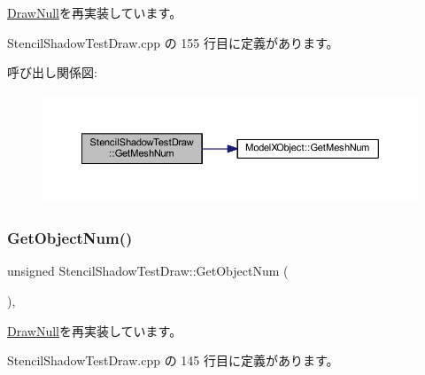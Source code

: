 \mbox{\hyperlink{class_draw_null_ad735978a85a5f3583eecd82d6bfe6413}{Draw\+Null}}を再実装しています。



 Stencil\+Shadow\+Test\+Draw.\+cpp の 155 行目に定義があります。

呼び出し関係図\+:\nopagebreak
\begin{figure}[H]
\begin{center}
\leavevmode
\includegraphics[width=350pt]{class_stencil_shadow_test_draw_acfa569f1dcdc3829796138e313f204ad_cgraph}
\end{center}
\end{figure}
\mbox{\label{class_stencil_shadow_test_draw_a8cc9a54a2bcb1fd006331fca1add02dc}} 
\subsubsection{\texorpdfstring{Get\+Object\+Num()}{GetObjectNum()}}
{\footnotesize\ttfamily unsigned Stencil\+Shadow\+Test\+Draw\+::\+Get\+Object\+Num (\begin{DoxyParamCaption}{ }\end{DoxyParamCaption})\hspace{0.3cm}{\ttfamily [override]}, {\ttfamily [virtual]}}



\mbox{\hyperlink{class_draw_null_aaffa15d184f1d09512ccaa3bdad3f658}{Draw\+Null}}を再実装しています。



 Stencil\+Shadow\+Test\+Draw.\+cpp の 145 行目に定義があります。

\mbox{\label{class_stencil_shadow_test_draw_a65be72e71cd12cacf315b0364c12c3e3}} 
